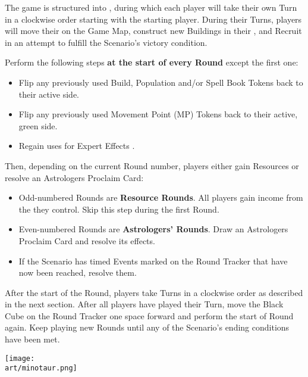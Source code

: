 
\begin{multicols*}{2}

The game is structured into , during which each player will take their own Turn in a clockwise order starting with the starting player.
During their Turns, players will move their  on the Game Map, construct new Buildings in their , and Recruit  in an attempt to fulfill the Scenario's victory condition.\par
Perform the following steps \textbf{at the start of every Round} except the first one:
\begin{itemize}
  \item Flip any previously used Build, Population and/or Spell Book Tokens back to their active side.
  \item Flip any previously used Movement Point (MP) Tokens back to their active, green side.
  \item Regain uses for Expert Effects .
\end{itemize}
Then, depending on the current Round number, players either gain Resources or resolve an Astrologers Proclaim Card:
\begin{itemize}
  \item Odd-numbered Rounds are \textbf{Resource Rounds}.
    All players gain income from the  they control.
    Skip this step during the first Round.
  \item Even-numbered Rounds are \textbf{Astrologers' Rounds}.
    Draw an Astrologers Proclaim Card and resolve its effects.
  \item If the Scenario has timed Events marked on the Round Tracker that have now been reached, resolve them.
\end{itemize}
After the start of the Round, players take Turns in a clockwise order as described in the next section.
After all players have played their Turn, move the Black Cube on the Round Tracker one space forward and perform the start of Round again.
Keep playing new Rounds until any of the Scenario's ending conditions have been met.

\vspace*{\fill}

\texttt{[image: \\art/minotaur.png]}

\vspace*{\fill}


\end{multicols*}
